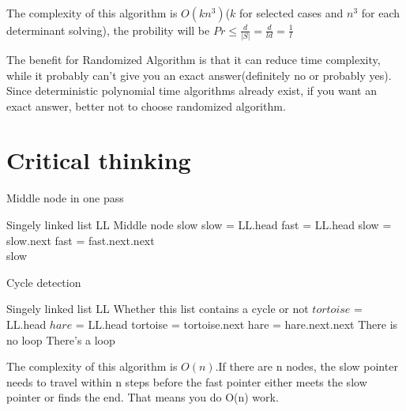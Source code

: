 \documentclass{article}
\begin{document}
\\
The complexity of this algorithm is $O(kn^3)$($k$ for selected cases and $n^3$ for each determinant solving), the probility will be $Pr \leq \frac{d}{|S|}=\frac{d}{ld}=\frac{1}{l}$
\newline{}
The benefit for Randomized Algorithm is that it can reduce time complexity, while it probably can't give you an exact answer(definitely no or probably yes). Since deterministic polynomial time algorithms already exist, if you want an exact answer, better not to choose randomized algorithm.
\section{Critical thinking}

\begin{algorithm}
    \caption{Middle node in one pass}
    \begin{algorithmic}[1]
    \Require Singely linked list LL
    \Ensure Middle node slow
    \State slow = LL.head
    \State fast = LL.head
        \State slow = slow.next
        \State fast = fast.next.next
    \EndWhile \\
    \Return slow
    \EndFunction
    \end{algorithmic}
\end{algorithm}
\begin{algorithm}
    \caption{Cycle detection}
    \begin{algorithmic}[1]
    \Require Singely linked list LL
    \Ensure Whether this list contains a cycle or not
    \State $tortoise$ = LL.head
    \State $hare$ = LL.head
        \State tortoise = tortoise.next
        \State hare = hare.next.next
    \EndWhile
            \Return There is no loop
        \Else 
            \Return There's a loop
    \EndIf
    \EndFunction
    \end{algorithmic}
\end{algorithm}
The complexity of this algorithm is $O(n)$.If there are n nodes, the slow pointer needs to travel within n steps before the fast pointer either meets the slow pointer or finds the end. That means you do O(n) work. 
\end{document}
